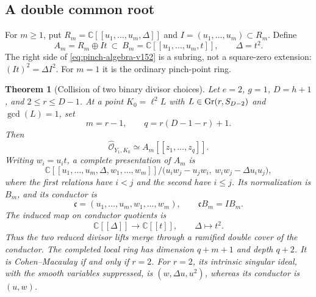\documentclass[11pt,reqno]{amsart}
\numberwithin{equation}{section}
\newtheorem{theorem}{Theorem}[section]
\theoremstyle{definition}\newtheorem{definition}[theorem]{Definition}
\theoremstyle{remark}\newtheorem{remark}[theorem]{Remark}
\newcommand{\C}{\mathbb C}\newcommand{\Q}{\mathbb Q}
\newcommand{\OO}{\mathcal O}\newcommand{\II}{\mathcal I}
\begin{document}
\subsection{A double common root}
For $m\geq1$, put $R_m=\C[[u_1,\ldots,u_m,\Delta]]$ and
$I=(u_1,\ldots,u_m)\subset R_m$.  Define
\begin{equation}\label{eq:pinch-algebra-v152}
 A_m=R_m\oplus I t\ \subset\ B_m=\C[[u_1,\ldots,u_m,t]],
                    \qquad \Delta=t^2.
\end{equation}
The right side of \eqref{eq:pinch-algebra-v152} is a subring,
not a square-zero extension: $(It)^2=\Delta I^2$.  For $m=1$
it is the ordinary pinch-point ring.

\begin{theorem}[Collision of two binary divisor choices]
\label{thm:binary-pinch-v152}
Let $e=2$, $g=1$, $D=h+1$, and $2\leq r\leq D-1$.
At a point $K_0=\ell^2 L$ with
$L\in\operatorname{Gr}(r,S_{D-2})$ and $\gcd(L)=1$, set
\[
             m=r-1,\qquad q=r(D-1-r)+1.
\]
Then
\begin{equation}\label{eq:binary-completion-v152}
              \widehat{\OO}_{Y_1,K_0}\simeq A_m[[z_1,\ldots,z_q]].
\end{equation}
Writing $w_i=u_i t$, a complete presentation of $A_m$ is
\begin{equation}\label{eq:pinch-equations-v152}
 \C[[u_1,\ldots,u_m,\Delta,w_1,\ldots,w_m]]/
 \bigl(u_iw_j-u_jw_i,\ w_iw_j-\Delta u_i u_j\bigr),
\end{equation}
where the first relations have $i<j$ and the second have $i\leq j$.
Its normalization is $B_m$, and its conductor is
\[
 \mathfrak c=(u_1,\ldots,u_m,w_1,\ldots,w_m),\qquad
 \mathfrak c B_m=I B_m.
\]
The induced map on conductor quotients is
\begin{equation}\label{eq:conductor-cover-v152}
              \C[[\Delta]]\longrightarrow\C[[t]],\qquad\Delta\longmapsto t^2.
\end{equation}
Thus the two reduced divisor lifts merge through a ramified double
cover of the conductor.  The completed local ring has dimension
$q+m+1$ and depth $q+2$.  It is Cohen--Macaulay if and only if $r=2$.
For $r=2$, its intrinsic singular ideal, with the smooth variables
suppressed, is $(w,\Delta u,u^2)$, whereas its conductor is $(u,w)$.
\end{theorem}
\end{document}
